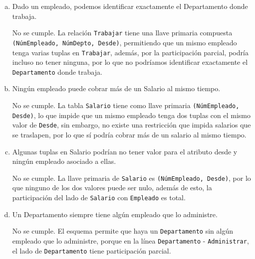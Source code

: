 \begin{enumerate}[a.]
    No se cumple. Aunque se define el periodo [desde,hasta), esto no impone una restricción que impida que \texttt{Hasta} sea anterior a \texttt{Desde}, además, se indica no considerar restricciones adicionales a las de cardinalidad y participación.

    \item Dado un empleado, podemos identificar exactamente el Departamento donde trabaja.
    
    No se cumple. La relación \texttt{Trabajar} tiene una llave primaria compuesta \texttt{(NúmEmpleado, NúmDepto, Desde)}, permitiendo que un mismo empleado tenga varias tuplas en \texttt{Trabajar}, además, por la participación parcial, podría incluso no tener ninguna, por lo que no podríamos identificar exactamente el \texttt{Departamento} donde trabaja.

    \item Ningún empleado puede cobrar más de un Salario al mismo tiempo.
    
    No se cumple. La tabla \texttt{Salario} tiene como llave primaria \texttt{(NúmEmpleado, Desde)}, lo que impide que un mismo empleado tenga dos tuplas con el mismo valor de \texttt{Desde}, sin embargo, no existe una restricción que impida salarios que se traslapen, por lo que sí podría cobrar más de un salario al mismo tiempo.

    \item Algunas tuplas en Salario podrían no tener valor para el atributo desde y ningún empleado asociado a ellas.
    
    No se cumple. La llave primaria de \texttt{Salario} es \texttt{(NúmEmpleado, Desde)}, por lo que ninguno de los dos valores puede ser nulo, además de esto, la participación del lado de \texttt{Salario} con \texttt{Empleado} es total.

    \item Un Departamento siempre tiene algún empleado que lo administre.
    
    No se cumple. El esquema permite que haya un \texttt{Departamento} sin algún empleado que lo administre, porque en la línea \texttt{Departamento} - \texttt{Administrar}, el lado de \texttt{Departamento} tiene participación parcial.

\end{enumerate}
